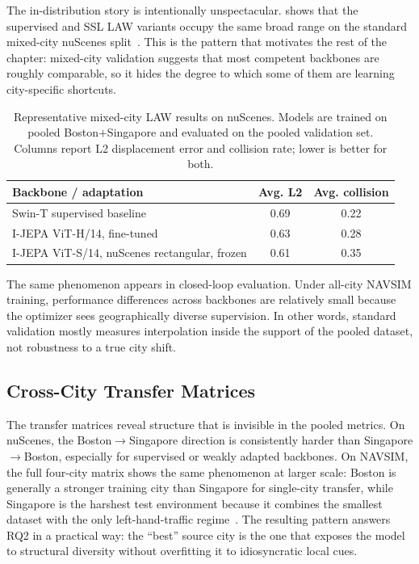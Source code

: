 The in-distribution story is intentionally unspectacular.  shows that the supervised and SSL LAW variants occupy the same broad range on the standard mixed-city nuScenes split~\cite{naeinian-cross-city-2026}. This is the pattern that motivates the rest of the chapter: mixed-city validation suggests that most competent backbones are roughly comparable, so it hides the degree to which some of them are learning city-specific shortcuts.

\begin{table}[ht]
\centering
\caption[Mixed-city LAW results on nuScenes.]{Representative mixed-city LAW results on nuScenes. Models are trained on pooled Boston$+$Singapore and evaluated on the pooled validation set. Columns report L2 displacement error and collision rate; lower is better for both.}
\label{tab:exp-law-indist}
\small
\renewcommand{\arraystretch}{1.15}
\setlength{\tabcolsep}{6pt}
\begin{tabular}{@{}>{\raggedright\arraybackslash}p{5.4cm} c c@{}}
\toprule
\textbf{Backbone / adaptation} & \textbf{Avg. L2} & \textbf{Avg. collision} \\
\midrule
Swin-T supervised baseline & 0.69 & 0.22 \\
I-JEPA ViT-H/14, fine-tuned & 0.63 & 0.28 \\
I-JEPA ViT-S/14, nuScenes rectangular, frozen & 0.61 & 0.35 \\
\bottomrule
\end{tabular}
\end{table}

The same phenomenon appears in closed-loop evaluation. Under all-city NAVSIM training, performance differences across backbones are relatively small because the optimizer sees geographically diverse supervision. In other words, standard validation mostly measures interpolation inside the support of the pooled dataset, not robustness to a true city shift.

\subsection{Cross-City Transfer Matrices}
\label{sec:exp-phase1-matrix}

The transfer matrices reveal structure that is invisible in the pooled metrics. On nuScenes, the Boston$\rightarrow$Singapore direction is consistently harder than Singapore$\rightarrow$Boston, especially for supervised or weakly adapted backbones. On NAVSIM, the full four-city matrix shows the same phenomenon at larger scale: Boston is generally a stronger training city than Singapore for single-city transfer, while Singapore is the harshest test environment because it combines the smallest dataset with the only left-hand-traffic regime~\cite{naeinian-cross-city-2026}. The resulting pattern answers RQ2 in a practical way: the ``best'' source city is the one that exposes the model to structural diversity without overfitting it to idiosyncratic local cues.

